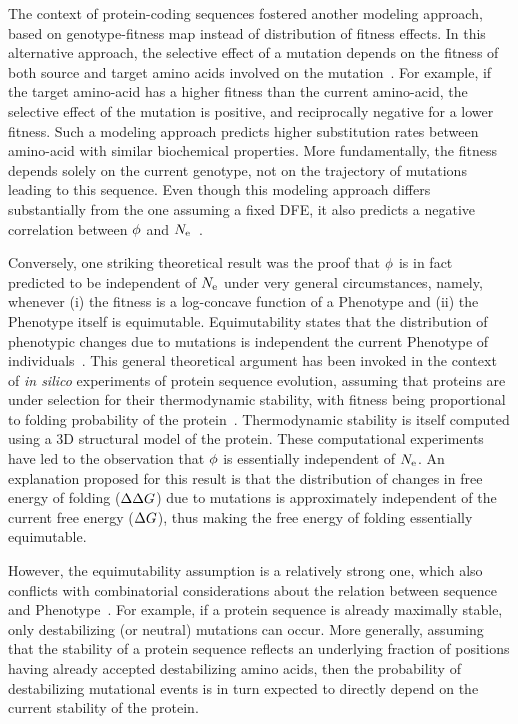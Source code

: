 The context of protein-coding sequences fostered another modeling approach, based on genotype-fitness map instead of distribution of fitness effects.
In this alternative approach, the selective effect of a mutation depends on the fitness of both source and target amino acids involved on the mutation~\citep{Halpern1998, Rodrigue2010, Tamuri2012}.
For example, if the target amino-acid has a higher fitness than the current amino-acid, the selective effect of the mutation is positive, and reciprocally negative for a lower fitness.
Such a modeling approach predicts higher \gls{substitution} rates between amino-acid with similar biochemical properties.
More fundamentally, the fitness depends solely on the current genotype, not on the trajectory of mutations leading to this sequence.
Even though this modeling approach differs substantially from the one assuming a fixed \acrshort{DFE}, it also predicts a negative correlation between $\phi$ and $N_{\mathrm{e}}$~\citep{Spielman2015, DosReis2015}.

Conversely, one striking theoretical result was the proof that $\phi$ is in fact predicted to be independent of $N_{\mathrm{e}}$ under very general circumstances, namely, whenever (i) the fitness is a log-concave function of a \gls{Phenotype} and (ii) the \gls{Phenotype} itself is equimutable.
Equimutability states that the distribution of phenotypic changes due to mutations is independent the current \gls{Phenotype} of individuals~\citep{Cherry1998}.
This general theoretical argument has been invoked in the context of \textit{in silico} experiments of protein sequence evolution, assuming that proteins are under selection for their thermodynamic stability, with fitness being proportional to folding probability of the protein~\citep{Goldstein2013}.
Thermodynamic stability is itself computed using a 3D structural model of the protein.
These computational experiments have led to the observation that $\phi$ is essentially independent of $N_{\mathrm{e}}$.
An explanation proposed for this result is that the distribution of changes in free energy of folding ($\Delta \Delta G$) due to mutations is approximately independent of the current free energy ($\Delta G$), thus making the free energy of folding essentially equimutable.

However, the equimutability assumption is a relatively strong one, which also conflicts with combinatorial considerations about the relation between sequence and \gls{Phenotype}~\citep{Serohijos2012}.
For example, if a protein sequence is already maximally stable, only destabilizing (or neutral) mutations can occur.
More generally, assuming that the stability of a protein sequence reflects an underlying fraction of positions having already accepted destabilizing amino acids, then the probability of destabilizing mutational events is in turn expected to directly depend on the current stability of the protein.

